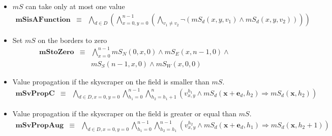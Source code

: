 \documentclass[a4paper, 12pt, titlepage]{article}
\begin{document}
\begin{itemize}
	\item $mS$ can take only at most one value
	\begin{eqnarray}
		\pmb{mSisAFunction} &\equiv& \bigwedge_{d\in D} \left( \bigwedge_{x=0,y=0}^{n-1} \left( \bigwedge_{v_1 \not = v_2} \neg \left( mS_{d}(x,y,v_1) \wedge mS_{d}(x,y,v_2) \right) \right) \right)
	\end{eqnarray}
	\item Set $mS$ on the borders to zero
	\begin{eqnarray}
		\pmb{mStoZero} &\equiv& \bigwedge_{x=0}^{n-1} mS_{N}(0,x,0) \wedge mS_{E}(x,n-1,0) \wedge \nonumber \\
	&&  mS_{S}(n-1,x,0) \wedge mS_{W}(x,0,0)
	\end{eqnarray}
	\item Value propagation if the skyscraper on the field is smaller than $mS$.
	\begin{eqnarray}
		\pmb{mSvPropC} &\equiv& \bigwedge_{d \in D,x=0,y=0} \bigwedge_{h_1=0}^{n-1} \bigwedge_{h_2 = h_1+1}^{n} \left( v_{x,y}^{h_1} \wedge mS_{d}(\pmb x + \pmb e_{d},h_2) \Rightarrow mS_{d}(\pmb x,h_2) \right)
	\end{eqnarray}
	\item Value propagation if the skyscraper on the field is greater or equal than $mS$.
	\begin{eqnarray}
		\pmb{mSvPropAug} &\equiv& \bigwedge_{d \in D,x=0,y=0} \bigwedge_{h_1=0}^{n-1} \bigwedge_{h_2=h_1}^{n-1} \left( v_{x,y}^{h_2} \wedge mS_{d}(\pmb x + \pmb e_{d},h_1) \Rightarrow mS_{d}(\pmb x,h_2+1) \right)
	\end{eqnarray}
\end{itemize}
\end{document}
